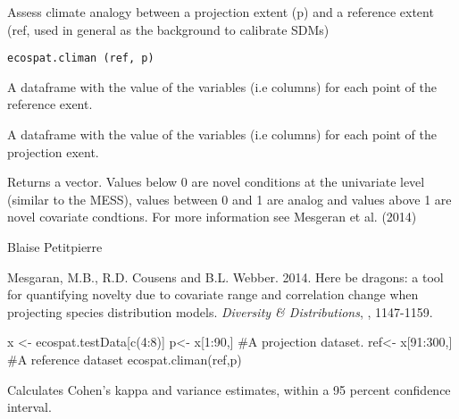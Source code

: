 \documentclass[a4paper]{book}
\begin{document}
%
\begin{Description}\relax
Assess climate analogy between a projection extent (p) and a reference extent (ref, used in general as the background to calibrate SDMs)
\end{Description}
%
\begin{Usage}
\begin{verbatim}
ecospat.climan (ref, p)
\end{verbatim}
\end{Usage}
%
\begin{Arguments}
\begin{ldescription}
\item[\code{ref}] A dataframe with the value of the variables (i.e columns) for each point of the reference exent.
\item[\code{p}] A dataframe with the value of the variables (i.e columns) for each point of the projection exent.

\end{ldescription}
\end{Arguments}
%
\begin{Value}
Returns a vector. Values below 0 are novel conditions at the univariate level (similar to the MESS), values between 0 and 1 are analog and values above 1 are novel covariate condtions. 
For more information see Mesgeran et al. (2014)
\end{Value}
%
\begin{Author}\relax
Blaise Petitpierre 
\end{Author}
%
\begin{References}\relax
Mesgaran, M.B., R.D. Cousens and B.L. Webber. 2014. Here be dragons: a tool for quantifying novelty due to covariate range and correlation change when projecting species distribution models. \emph{Diversity \& Distributions}, , 1147-1159.
\end{References}
%
\begin{Examples}
\begin{ExampleCode}
x <- ecospat.testData[c(4:8)]
p<- x[1:90,] #A projection dataset.
ref<- x[91:300,] #A reference dataset
ecospat.climan(ref,p)

\end{ExampleCode}
\end{Examples}
%
\begin{Description}\relax
Calculates Cohen's kappa and variance estimates, within a 95 percent confidence interval.
\end{Description}
\end{document}
